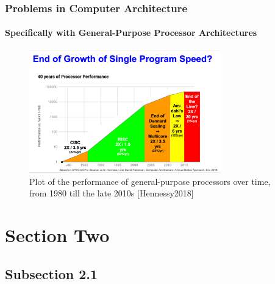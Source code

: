 \documentclass[xcolor={usenames,dvipsnames},hyperref={hyperindex,bookmarks}]{beamer}
\begin{document}

\begin{frame}
	\frametitle{Problems in Computer Architecture}
	\framesubtitle{Specifically with General-Purpose Processor Architectures}
	
	\begin{figure}
		\centering
		\includegraphics[height=2.1in]{./pics/ProblemsInComputerArchitecture}
		\caption{Plot of the performance of general-purpose processors over time, from 1980 till the late 2010s [Hennessy2018]}
	\end{figure}
\end{frame}







\section{Section Two}


\subsection{Subsection 2.1}
\end{document}
